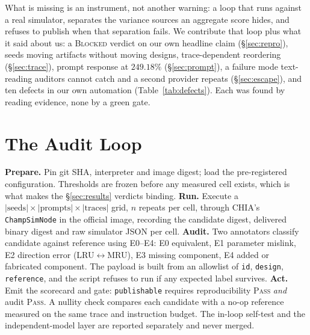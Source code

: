 \documentclass[sigconf,anonymous,nonacm]{acmart}
\begin{document}
What is missing is an instrument, not another warning: a loop that runs against a real simulator, separates the variance sources an aggregate score hides, and refuses to publish when that separation fails. We contribute that loop plus what it said about us: a \textsc{Blocked} verdict on our own headline claim (\S\ref{sec:repro}), seeds moving artifacts without moving designs, trace-dependent reordering (\S\ref{sec:trace}), prompt response at $249.18\%$ (\S\ref{sec:prompt}), a failure mode text-reading auditors cannot catch and a second provider repeats (\S\ref{sec:escape}), and ten defects in our own automation (Table~\ref{tab:defects}). Each was found by reading evidence, none by a green gate.

\section{The Audit Loop}
\label{sec:loop}

\textbf{Prepare.} Pin git SHA, interpreter and image digest; load the pre-registered configuration. Thresholds are frozen before any measured cell exists, which is what makes the \S\ref{sec:results} verdicts binding. \textbf{Run.} Execute a $|\text{seeds}|\times|\text{prompts}|\times|\text{traces}|$ grid, $n$ repeats per cell, through CHIA's \texttt{ChampSimNode} in the official image, recording the candidate digest, delivered binary digest and raw simulator JSON per cell. \textbf{Audit.} Two annotators classify candidate against reference using E0--E4: E0 equivalent, E1 parameter mislink, E2 direction error (LRU$\leftrightarrow$MRU), E3 missing component, E4 added or fabricated component. The payload is built from an allowlist of \texttt{id}, \texttt{design}, \texttt{reference}, and the script refuses to run if any expected label survives. \textbf{Act.} Emit the scorecard and gate: \texttt{publishable} requires reproducibility \textsc{Pass} \emph{and} audit \textsc{Pass}. A nullity check compares each candidate with a no-op reference measured on the same trace and instruction budget. The in-loop self-test and the independent-model layer are reported separately and never merged.
\end{document}
